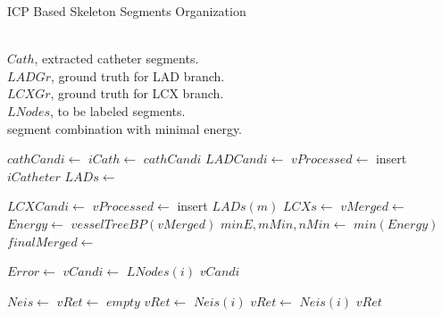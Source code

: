 \documentclass[journal]{IEEEtran}
\begin{document}
\begin{algorithm}
  \caption{ICP Based Skeleton Segments Organization}
  \label{alg:icp_matching}
  \renewcommand{\algorithmicrequire}{\textbf{Input:}}
  \renewcommand{\algorithmicensure}{\textbf{Output:}}
  \begin{algorithmic}
  \Require ~~\\
    $Cath$, extracted catheter segments.\\
    $LADGr$, ground truth for LAD branch.\\
    $LCXGr$, ground truth for LCX branch.\\
    $LNodes$, to be labeled segments.
  \Ensure ~~\\
    segment combination with minimal energy.

  \State $cathCandi \gets$ 
  \State $iCath \gets$ $cathCandi$
  \State $LADCandi \gets$ 
  \State $vProcessed \gets$ insert $iCatheter$
  \State $LADs\gets$ 

    \State $LCXCandi \gets$ 
    \State $vProcessed \gets$ insert $LADs(m)$
    \State $LCXs \gets$ 
        \State $vMerged \gets$ 
        \State $Energy \gets$ $vesselTreeBP(vMerged)$
    \EndFor
  \EndFor
  \State $minE,mMin,nMin \gets$ $min(Energy)$
  \State $finalMerged \gets$ 
  \EndFunction

       \State $Error \gets$ 
        \State $vCandi \gets$ $LNodes(i)$
       \EndIf
    \EndFor
    \State \Return $vCandi$
  \EndFunction

  \State $Neis \gets$ 
  \State $vRet \gets$ $empty$
                    \State $vRet \gets$ $Neis(i)$
                \Else
                     \State $vRet \gets$ $Neis(i)$
                     \State {}
                \EndIf
            \EndIf
        \EndIf
    \EndFor
        \State \Return $vRet$
    \EndIf
  \EndFunction
  \end{algorithmic}
\end{algorithm}
\end{document}
